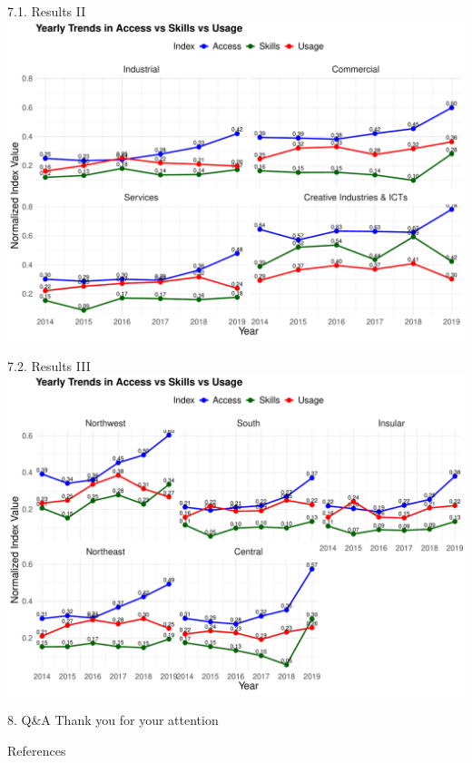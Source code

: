 \documentclass[
  ignorenonframetext,
]{beamer}
\newif\ifbibliography
\begin{document}
\begin{frame}{7.1. Results II}
\label{results-ii}
\includegraphics{FactoAnalysisDigitalDivide_files/figure-beamer/yearTrendMac-1.pdf}
\end{frame}

\begin{frame}{7.2. Results III}
\label{results-iii}
\includegraphics{FactoAnalysisDigitalDivide_files/figure-beamer/yearTrendReg-1.pdf}
\end{frame}

\begin{frame}{8. Q\&A}
\label{qa}
Thank you for your attention
\end{frame}

\renewcommand\refname{References}
\begin{frame}[allowframebreaks]{References}
  \bibliographytrue
  
\end{frame}
\end{document}
